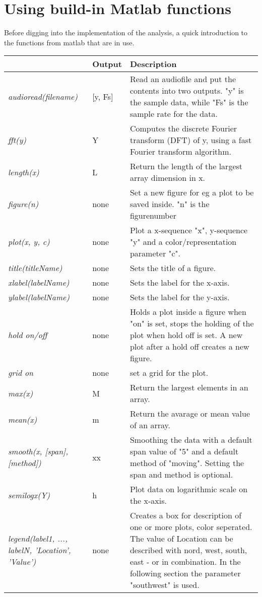 \section{Using build-in Matlab functions}

Before digging into the implementation of the analysis, a quick introduction to the functions from matlab that are in use.
\begin{longtabu}{>{\em}X l X}
 & Output & \textbf{Description} \\
\hline
audioread(filename) & [y, Fs] & Read an audiofile and put the contents into two outputs. "y" is the sample data, while "Fs" is the sample rate for the data. \\
fft(y) & Y & Computes the discrete Fourier transform (DFT) of y, using a fast Fourier transform algorithm. \\
length(x) & L & Return the length of the largest array dimension in x.  \\
figure(n) & none & Set a new figure for eg a plot to be saved inside. "n" is the figurenumber \\
plot(x, y, c) & none & Plot a x-sequence "x", y-sequence "y" and a color/representation parameter "c". \\
title(titleName) & none & Sets the title of a figure. \\
xlabel(labelName) & none & Sets the label for the x-axis. \\
ylabel(labelName) & none & Sets the label for the y-axis. \\
hold on/off & none & Holds a plot inside a figure when "on" is set, stops the holding of the plot when hold off is set. A new plot after a hold off creates a new figure. \\
grid on & none & set a grid for the plot. \\
max(x) & M & Return the largest elements in an array. \\
mean(x) & m & Return the avarage or mean value of an array. \\
smooth(x, [span], [method]) & xx & Smoothing the data with a default span value of "5" and a default method of "moving". Setting the span and method is optional.\\
semilogx(Y) & h & Plot data on logarithmic scale on the x-axis. \\
legend(label1, ..., labelN, 'Location', 'Value') & none & Creates a box for description of one or more plots, color seperated. The value of Location can be described with nord, west, south, east - or in combination. In the following section the parameter "southwest" is used. \\

\end{longtabu}
